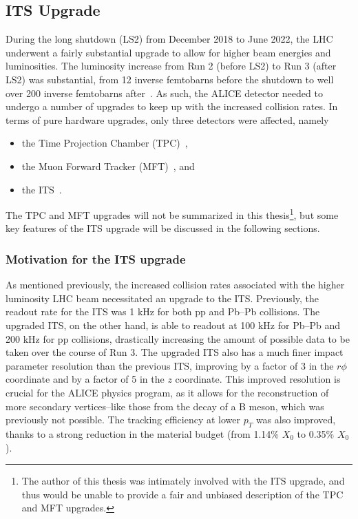 \subsection{ITS Upgrade}
During the long shutdown (LS2) from December 2018 to June 2022, the LHC underwent a fairly substantial upgrade to allow for higher beam energies and luminosities. The luminosity increase from Run 2 (before LS2) to Run 3 (after LS2) was substantial, from 12 inverse femtobarns before the shutdown to well over 200 inverse femtobarns after~\cite{LHCUpgrade}. As such, the ALICE detector needed to undergo a number of upgrades to keep up with the increased collision rates. In terms of pure hardware upgrades, only three detectors were affected, namely
\begin{itemize}
    \item the Time Projection Chamber (TPC)~\cite{TPCUpgrade},
    \item the Muon Forward Tracker (MFT)~\cite{MFTUpgrade}, and
    \item the ITS~\cite{ITSUpgrade}.
\end{itemize}
The TPC and MFT upgrades will not be summarized in this thesis\footnote{The author of this thesis was intimately involved with the ITS upgrade, and thus would be unable to provide a fair and unbiased description of the TPC and MFT upgrades.}, but some key features of the ITS upgrade will be discussed in the following sections.

\subsubsection{Motivation for the ITS upgrade}
As mentioned previously, the increased collision rates associated with the higher luminosity LHC beam necessitated an upgrade to the ITS. Previously, the readout rate for the ITS was 1 kHz for both pp and Pb--Pb collisions. The upgraded ITS, on the other hand, is able to readout at 100 kHz for Pb--Pb and 200 kHz for pp collisions, drastically increasing the amount of possible data to be taken over the course of Run 3. The upgraded ITS also has a much finer impact parameter resolution than the previous ITS, improving by a factor of 3 in the $r\phi$ coordinate and by a factor of 5 in the $z$ coordinate. This improved resolution is crucial for the ALICE physics program, as it allows for the reconstruction of more secondary vertices--like those from the decay of a B meson, which was previously not possible. The tracking efficiency at lower $p_T$ was also improved, thanks to a strong reduction in the material budget (from 1.14\% $X_0$ to 0.35\% $X_0$).


